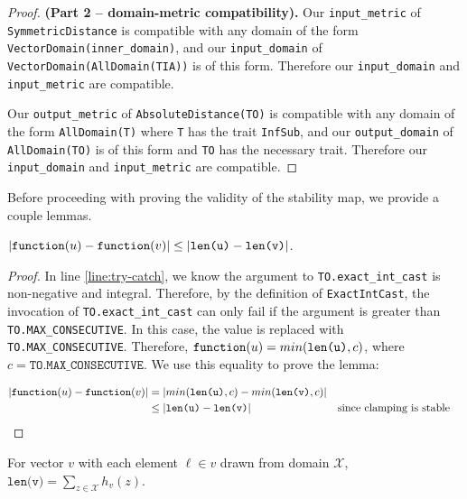 \documentclass{article}
\begin{document}
\begin{proof} \textbf{(Part 2 -- domain-metric compatibility).}
    Our \texttt{input\_metric} of \texttt{SymmetricDistance} is compatible with any domain of the form \texttt{VectorDomain(inner\_domain)}, 
    and our \texttt{input\_domain} of \\\texttt{VectorDomain(AllDomain(TIA))} is of this form. 
    Therefore our \texttt{input\_domain} and \texttt{input\_metric} are compatible.

    Our \texttt{output\_metric} of \texttt{AbsoluteDistance(TO)} is compatible with any domain of the form \texttt{AllDomain(T)} where \texttt{T} has the trait \texttt{InfSub}, 
    and our \texttt{output\_domain} of \texttt{AllDomain(TO)} is of this form and \texttt{TO} has the necessary trait.
    Therefore our \texttt{input\_domain} and \texttt{input\_metric} are compatible.
\end{proof}

Before proceeding with proving the validity of the stability map, we provide a couple lemmas.

\begin{lemma}
    \label{dsym-sens}
    $|\texttt{function}(u) - \texttt{function}(v)| \leq |\texttt{len(u)} - \texttt{len(v)}|$.
\end{lemma}

\begin{proof}
    In line \ref{line:try-catch}, we know the argument to \texttt{TO.exact\_int\_cast} is non-negative and integral.
    Therefore, by the definition of \texttt{ExactIntCast}, the invocation of \texttt{TO.exact\_int\_cast} can only fail if the argument is greater than \texttt{TO.MAX\_CONSECUTIVE}.
    In this case, the value is replaced with \texttt{TO.MAX\_CONSECUTIVE}.
    Therefore, $\texttt{function}(u) = min(\texttt{len(u)}, c)$, where $c = \texttt{TO.MAX\_CONSECUTIVE}$.
    We use this equality to prove the lemma:

    \begin{align*}
        |\texttt{function}(u) - \texttt{function}(v)| &= |min(\texttt{len(u)}, c) - min(\texttt{len(v)}, c)| \\
        &\leq |\texttt{len(u)} - \texttt{len(v)}| &&\text{since clamping is stable} \\
    \end{align*}
\end{proof}

\begin{lemma}
    \label{lemma:len-sum-equiv}
    For vector $v$ with each element $\ell\in v$ drawn from domain $\mathcal{X}$, $\texttt{len(v)} = \sum_{z\in\mathcal{X}} h_v(z)$.
\end{lemma}
\end{document}
